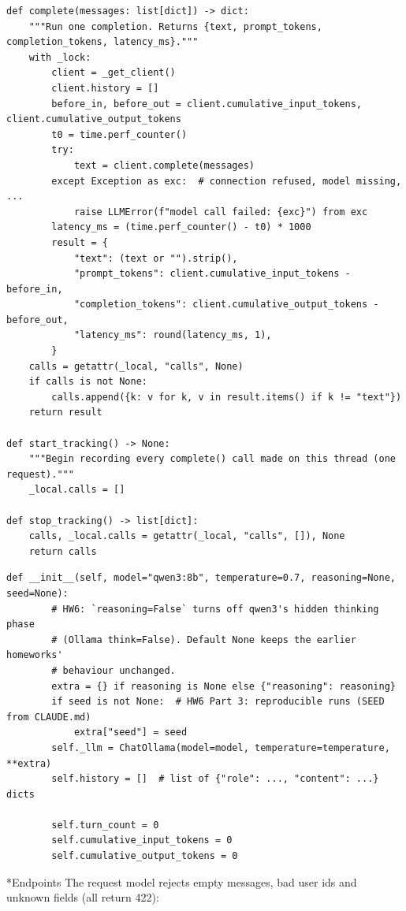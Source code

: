 \documentclass[11pt]{article}
\makeatletter
\renewcommand\subsection{\@startsection{subsection}{2}{\z@}{-2.2ex \@plus -1ex \@minus -.2ex}{0.8ex \@plus.2ex}{\normalfont\fontsize{12}{14.5}\selectfont\bfseries}}
\makeatother
\begin{document}
\begin{lstlisting}
def complete(messages: list[dict]) -> dict:
    """Run one completion. Returns {text, prompt_tokens, completion_tokens, latency_ms}."""
    with _lock:
        client = _get_client()
        client.history = []
        before_in, before_out = client.cumulative_input_tokens, client.cumulative_output_tokens
        t0 = time.perf_counter()
        try:
            text = client.complete(messages)
        except Exception as exc:  # connection refused, model missing, ...
            raise LLMError(f"model call failed: {exc}") from exc
        latency_ms = (time.perf_counter() - t0) * 1000
        result = {
            "text": (text or "").strip(),
            "prompt_tokens": client.cumulative_input_tokens - before_in,
            "completion_tokens": client.cumulative_output_tokens - before_out,
            "latency_ms": round(latency_ms, 1),
        }
    calls = getattr(_local, "calls", None)
    if calls is not None:
        calls.append({k: v for k, v in result.items() if k != "text"})
    return result

def start_tracking() -> None:
    """Begin recording every complete() call made on this thread (one request)."""
    _local.calls = []

def stop_tracking() -> list[dict]:
    calls, _local.calls = getattr(_local, "calls", []), None
    return calls
\end{lstlisting}
\endgroup
\begingroup\lstset{basicstyle=\ttfamily\scriptsize}
\begin{lstlisting}
def __init__(self, model="qwen3:8b", temperature=0.7, reasoning=None, seed=None):
        # HW6: `reasoning=False` turns off qwen3's hidden thinking phase
        # (Ollama think=False). Default None keeps the earlier homeworks'
        # behaviour unchanged.
        extra = {} if reasoning is None else {"reasoning": reasoning}
        if seed is not None:  # HW6 Part 3: reproducible runs (SEED from CLAUDE.md)
            extra["seed"] = seed
        self._llm = ChatOllama(model=model, temperature=temperature, **extra)
        self.history = []  # list of {"role": ..., "content": ...} dicts

        self.turn_count = 0
        self.cumulative_input_tokens = 0
        self.cumulative_output_tokens = 0
\end{lstlisting}
\endgroup
\subsection*{Endpoints}
The request model rejects empty messages, bad user ids and unknown fields (all return 422):
\end{document}
